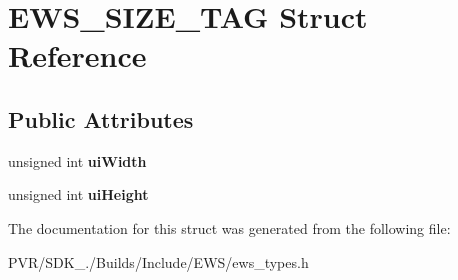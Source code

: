 \hypertarget{struct_e_w_s___s_i_z_e___t_a_g}{\section{E\+W\+S\+\_\+\+S\+I\+Z\+E\+\_\+\+T\+A\+G Struct Reference}
\label{struct_e_w_s___s_i_z_e___t_a_g}
}
\subsection*{Public Attributes}
\begin{DoxyCompactItemize}
\item 
\hypertarget{struct_e_w_s___s_i_z_e___t_a_g_a92fba277f861da5b92df21137c1d4aad}{unsigned int {\bfseries ui\+Width}}\label{struct_e_w_s___s_i_z_e___t_a_g_a92fba277f861da5b92df21137c1d4aad}

\item 
\hypertarget{struct_e_w_s___s_i_z_e___t_a_g_afc55688edd3ad3e49064c009b45848e7}{unsigned int {\bfseries ui\+Height}}\label{struct_e_w_s___s_i_z_e___t_a_g_afc55688edd3ad3e49064c009b45848e7}

\end{DoxyCompactItemize}


The documentation for this struct was generated from the following file\+:\begin{DoxyCompactItemize}
\item 
P\+V\+R/\+S\+D\+K\+\_./\+Builds/\+Include/\+E\+W\+S/ews\+\_\+types.\+h\end{DoxyCompactItemize}
